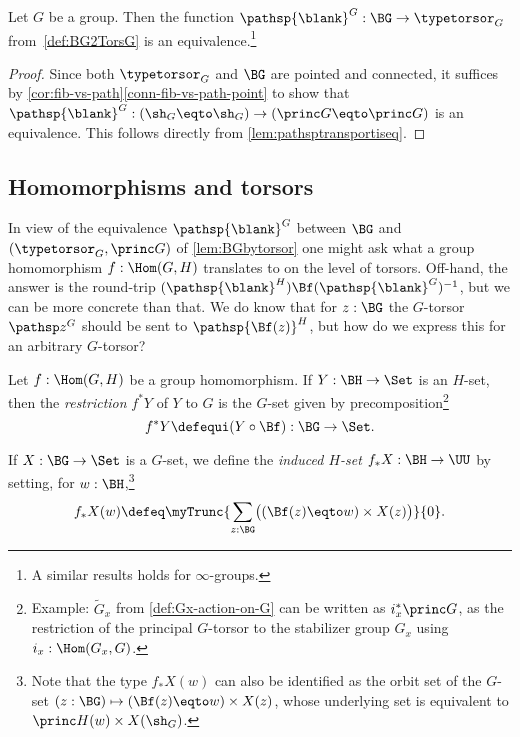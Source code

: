 \begin{theorem}\label{lem:BGbytorsor}
  Let $G$ be a group. Then the function
  $\pathsp{\blank}^G:\BG\to\typetorsor_G$ from~\cref{def:BG2TorsG}
  is an equivalence.\footnote{A similar results holds for $\infty$-groups.}
\end{theorem}

\begin{proof}
  Since both $\typetorsor_G$ and $\BG$ are pointed and connected,
  it suffices by
  \cref{cor:fib-vs-path}\ref{conn-fib-vs-path-point} to show that 
  $\pathsp{\blank}^G:(\sh_G\eqto\sh_G)\to(\princ G\eqto \princ G)$
  is an equivalence.
  This follows directly from \cref{lem:pathsptransportiseq}.
\end{proof}

\subsection{Homomorphisms and torsors}
\label{sec:homotor}
In view of the equivalence $\pathsp{\blank}^G$ between $\BG$ and 
$(\typetorsor_G,\princ G)$ of \cref{lem:BGbytorsor} one might 
ask what a group homomorphism  $f:\Hom(G,H)$ translates to on 
the level of torsors.  Off-hand, the answer is the round-trip 
$(\pathsp{\blank}^H)\Bf(\pathsp{\blank}^G)^{-1}$, but we can be more concrete than that.
We do know that for $z:\BG$ the $G$-torsor $\pathsp z^G$ should be sent to
$\pathsp {\Bf(z)}^H$, but how do we express this for an arbitrary $G$-torsor?
\begin{definition}
  \label{def:restrictandinduce}
  Let $f:\Hom(G,H)$ be a group homomorphism.  If $Y:\BH\to\Set$ is an $H$-set,
  then the \emph{restriction}
  $f^*Y$ of $Y$ to $G$ is the $G$-set given by precomposition\footnote{%
  Example: $\tilde G_x$ from \cref{def:Gx-action-on-G} can
  be written as $i_x^* \princ G$, \ie as the restriction of the
  principal $G$-torsor to the stabilizer group $G_x$ using $i_x:\Hom(G_x,G)$.}
  \[
    f^*Y\defequi (Y\circ\Bf) :\BG\to\Set.
  \]

  If $X:\BG\to\Set$ is a $G$-set, we define
  the \emph{induced $H$-set}
  $f_*X : \BH\to\UU$ by setting, for $w:\BH$,\footnote{%
\label{ft:f_*X(w)-orbitset}
Note that the type $f_*X(w)$ can also be identified as the orbit set of 
the $G$-set $(z:\BG) \mapsto (\Bf(z) \eqto w)\times X(z)$,
whose underlying set is equivalent to $\princ H(w)\times X(\sh_G)$.}
  \[
    f_*X(w)\defeq\myTrunc
    {\sum_{z:\BG}\bigl((\Bf(z) \eqto w)\times X(z)\bigr)}{0}.\qedhere
  \]
\end{definition}

